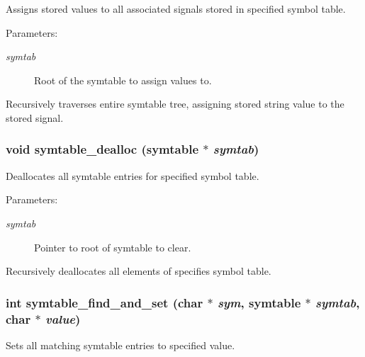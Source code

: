 Assigns stored values to all associated signals stored in specified symbol table.

\begin{Desc}
\item[Parameters:]
\begin{description}
\item[{\em symtab}]Root of the symtable to assign values to.\end{description}
\end{Desc}
Recursively traverses entire symtable tree, assigning stored string value to the stored signal. 
\subsubsection{\setlength{\rightskip}{0pt plus 5cm}void symtable\_\-dealloc ({\bf symtable} $\ast$ {\em symtab})}\label{symtable_8c_a4}


Deallocates all symtable entries for specified symbol table.

\begin{Desc}
\item[Parameters:]
\begin{description}
\item[{\em symtab}]Pointer to root of symtable to clear.\end{description}
\end{Desc}
Recursively deallocates all elements of specifies symbol table. 
\subsubsection{\setlength{\rightskip}{0pt plus 5cm}int symtable\_\-find\_\-and\_\-set (char $\ast$ {\em sym}, {\bf symtable} $\ast$ {\em symtab}, char $\ast$ {\em value})}\label{symtable_8c_a1}


Sets all matching symtable entries to specified value.

